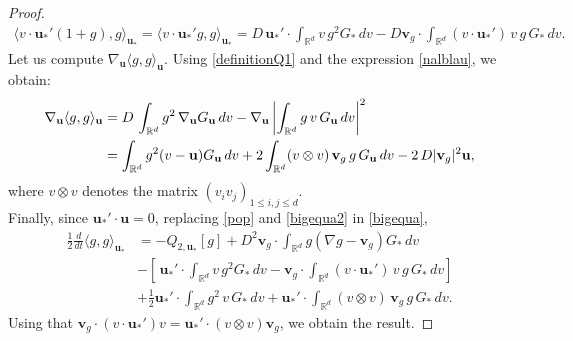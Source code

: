 \documentclass[10pt,a4paper]{amsart}
\begin{document}
\begin{proof}
\begin{align}
\label{pop}
    \langle v\cdot \mathbf{u}_*'(1+g),g\rangle_{\mathbf{u}_*}=\langle v\cdot \mathbf{u}_*'g,g\rangle_{\mathbf{u}_*}=D\,\mathbf{u}_*' \cdot \int_{\mathbb{R}^d}v\,g^2G_{*}\,dv- D\mathbf{v}_g \cdot\int_{\mathbb{R}^d}(v\cdot \mathbf{u}_*')\,v\,g\,G_{*}\, dv.
\end{align}
Let us compute $\nabla_\mathbf{u}\langle g,g \rangle_\mathbf{u} $.
Using \eqref{definitionQ1} and the expression \eqref{nalblau}, we obtain:
\begin{align}
\label{bigequa2}
    \nabla_\mathbf{u}\langle g,g \rangle_\mathbf{u}&=D\,\int_{\mathbb{R}^d}g^2\,\nabla_\mathbf{u} G_\mathbf{u}\,dv- \nabla_\mathbf{u}\left| \notag \int_{\mathbb{R}^d}g\,v\,G_\mathbf{u}\,dv\right|^2\\&=\int_{\mathbb{R}^d}g^2(v-\mathbf{u})G_\mathbf{u}\,dv+2  \int_{\mathbb{R}^d}(v \otimes v)\, \mathbf{v}_g \,g\, G_\mathbf{u}\,dv-2\,D |\mathbf{v}_g|^2\mathbf{u},
\end{align}
where $v\otimes v$ denotes the matrix $(v_iv_j)_{1\leq i,j\leq d}$.\\
Finally,
since $\mathbf{u}_*'\cdot \mathbf{u}=0$, replacing \eqref{pop} and \eqref{bigequa2} in \eqref{bigequa},
\begin{align*}
    \frac{1}{2}\frac{d}{dt}\langle g,g\rangle_{\mathbf{u}_*}&=-Q_{2,\mathbf{u}_*}[g] + D^2 \mathbf{v}_g \cdot  \int_{\mathbb{R}^d}g(\nabla g- \mathbf{v}_g)G_{{*}}\,dv\\& - \left[\,\mathbf{u}_*' \cdot \int_{\mathbb{R}^d}v\,g^2G_{*}\,dv - \mathbf{v}_g \cdot\int_{\mathbb{R}^d}(v\cdot \mathbf{u}_*')\,v\,g\,G_{*}\,dv\right]  \\&+\frac{1}{2}  \mathbf{u}_*'\cdot \int_{\mathbb{R}^d}g^2\,v\,G_{*}\,dv +  \mathbf{u}_*'\cdot\int_{\mathbb{R}^d}(v\otimes v) \,\mathbf{v}_g\, g\, G_{*}\, dv.
\end{align*}
Using that $\mathbf{v}_g\cdot (v\cdot \mathbf{u}_*')v=\mathbf{u}_*'\cdot (v\otimes v)\mathbf{v}_g$, we obtain the result.
\end{proof}
\end{document}
